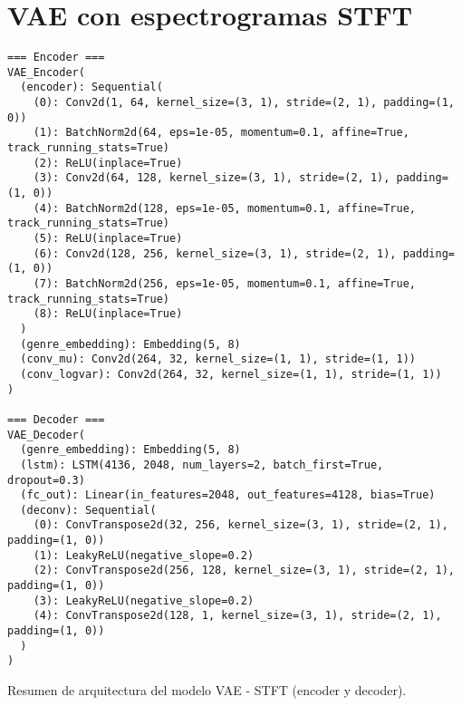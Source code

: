 \section{VAE con espectrogramas STFT}

\begin{table}[H]
\centering
\begin{minipage}{0.95\textwidth}
\begin{lstlisting}[basicstyle=\scriptsize\ttfamily]
=== Encoder ===
VAE_Encoder(
  (encoder): Sequential(
    (0): Conv2d(1, 64, kernel_size=(3, 1), stride=(2, 1), padding=(1, 0))
    (1): BatchNorm2d(64, eps=1e-05, momentum=0.1, affine=True, track_running_stats=True)
    (2): ReLU(inplace=True)
    (3): Conv2d(64, 128, kernel_size=(3, 1), stride=(2, 1), padding=(1, 0))
    (4): BatchNorm2d(128, eps=1e-05, momentum=0.1, affine=True, track_running_stats=True)
    (5): ReLU(inplace=True)
    (6): Conv2d(128, 256, kernel_size=(3, 1), stride=(2, 1), padding=(1, 0))
    (7): BatchNorm2d(256, eps=1e-05, momentum=0.1, affine=True, track_running_stats=True)
    (8): ReLU(inplace=True)
  )
  (genre_embedding): Embedding(5, 8)
  (conv_mu): Conv2d(264, 32, kernel_size=(1, 1), stride=(1, 1))
  (conv_logvar): Conv2d(264, 32, kernel_size=(1, 1), stride=(1, 1))
)

=== Decoder ===
VAE_Decoder(
  (genre_embedding): Embedding(5, 8)
  (lstm): LSTM(4136, 2048, num_layers=2, batch_first=True, dropout=0.3)
  (fc_out): Linear(in_features=2048, out_features=4128, bias=True)
  (deconv): Sequential(
    (0): ConvTranspose2d(32, 256, kernel_size=(3, 1), stride=(2, 1), padding=(1, 0))
    (1): LeakyReLU(negative_slope=0.2)
    (2): ConvTranspose2d(256, 128, kernel_size=(3, 1), stride=(2, 1), padding=(1, 0))
    (3): LeakyReLU(negative_slope=0.2)
    (4): ConvTranspose2d(128, 1, kernel_size=(3, 1), stride=(2, 1), padding=(1, 0))
  )
)

\end{lstlisting}
\end{minipage}
\caption{Resumen de arquitectura del modelo VAE - STFT (encoder y decoder).}
\label{tab:vae_stft_model_summary}
\end{table}

